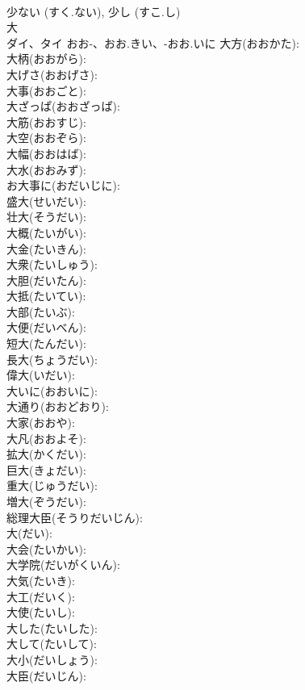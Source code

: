 \documentclass[8pt]{extreport}
\begin{document}
\begin{CJK}{UTF8}{min}
\\	少ない (すく.ない), 少し (すこ.し)
\\	大			
\\	ダイ、タイ	おお-、おお.きい、-おお.いに	大方(おおかた): 
\\	大柄(おおがら): 
\\	大げさ(おおげさ): 
\\	大事(おおごと): 
\\	大ざっぱ(おおざっぱ): 
\\	大筋(おおすじ): 
\\	大空(おおぞら): 
\\	大幅(おおはば): 
\\	大水(おおみず): 
\\	お大事に(おだいじに): 
\\	盛大(せいだい): 
\\	壮大(そうだい): 
\\	大概(たいがい): 
\\	大金(たいきん): 
\\	大衆(たいしゅう): 
\\	大胆(だいたん): 
\\	大抵(たいてい): 
\\	大部(たいぶ): 
\\	大便(だいべん): 
\\	短大(たんだい): 
\\	長大(ちょうだい): 
\\	偉大(いだい): 
\\	大いに(おおいに): 
\\	大通り(おおどおり): 
\\	大家(おおや): 
\\	大凡(おおよそ): 
\\	拡大(かくだい): 
\\	巨大(きょだい): 
\\	重大(じゅうだい): 
\\	増大(ぞうだい): 
\\	総理大臣(そうりだいじん): 
\\	大(だい): 
\\	大会(たいかい): 
\\	大学院(だいがくいん): 
\\	大気(たいき): 
\\	大工(だいく): 
\\	大使(たいし): 
\\	大した(たいした): 
\\	大して(たいして): 
\\	大小(だいしょう): 
\\	大臣(だいじん): 

\end{CJK}
\end{document}
